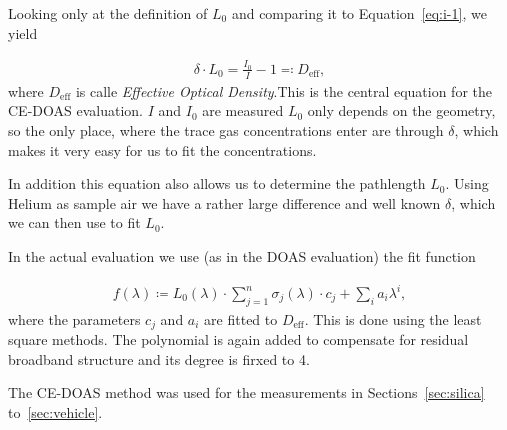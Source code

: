 Looking only at the definition of $L_0$ and comparing it to
Equation~\eqref{eq:i-1}, we yield

\begin{align}
  \delta \cdot L_0 = \frac{I_0}{I} - 1 \eqqcolon D_{\text{eff}}, \label{eq:ce-central}
\end{align}
where $D_{\text{eff}}$ is calle \emph{Effective Optical Density}.This
is the central equation for the CE-DOAS evaluation. $I$ and $I_0$ are
measured $L_0$ only depends on the geometry, so the only place, where
the trace gas concentrations enter are through $\delta$, which makes
it very easy for us to fit the concentrations.

In addition this equation also allows us to determine the pathlength
$L_0$. Using Helium as sample air we have a rather large difference
and well known $\delta$, which we can then use to fit
$L_0$.

In the actual evaluation we use (as in the DOAS evaluation) the fit function

\begin{align*}
  f(\lambda) \coloneqq L_0(\lambda)\cdot\sum_{j=1}^n \sigma_j(\lambda)
  \cdot c_j + \sum_i a_i \lambda^i,
\end{align*}
where the parameters $c_j$ and $a_i$ are fitted to
$D_{\text{eff}}$. This is done using the least square methods. The
polynomial is again added to compensate for residual broadband
structure and its degree is firxed to \num{4}.

The CE-DOAS method was used for the measurements in
Sections~\ref{sec:silica} to~\ref{sec:vehicle}. 

